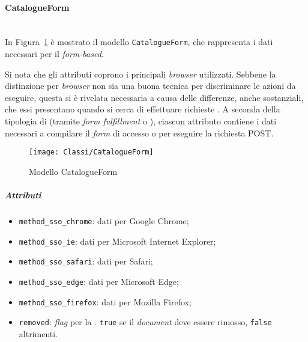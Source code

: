 \paragraph{CatalogueForm} \mbox{} \\
In Figura~\ref{fig:CatalogueForm} è mostrato il modello \texttt{CatalogueForm}, che rappresenta i dati necessari per il  \textit{form-based}. 

Si nota che gli attributi coprono i principali \textit{browser} utilizzati. Sebbene la distinzione per \textit{browser} non sia una buona tecnica per discriminare le azioni da eseguire, questa si è rivelata necessaria a causa delle differenze, anche sostanziali, che essi presentano quando si cerca di effettuare richieste . A seconda della tipologia di  (tramite \textit{form fulfillment} o ), ciascun attributo contiene i dati necessari a compilare il \textit{form} di accesso o per eseguire la richiesta POST.
\begin{figure}[hbpc]
  \begin{center}
    \texttt{[image: Classi/CatalogueForm]}
  \caption[Modello CatalogueForm]{Modello CatalogueForm}
  \label{fig:CatalogueForm}
  \end{center} 
\end{figure}
\subparagraph{Attributi}
\begin{itemize}
\item \texttt{method\_sso\_chrome}: dati per Google Chrome;
\item \texttt{method\_sso\_ie}: dati per Microsoft Internet Explorer;
\item \texttt{method\_sso\_safari}: dati per Safari;
\item \texttt{method\_sso\_edge}: dati per Microsoft Edge;
\item \texttt{method\_sso\_firefox}: dati per Mozilla Firefox;
\item \texttt{removed}: \textit{flag} per la . \texttt{true} se il \textit{document} deve essere rimosso, \texttt{false} altrimenti.
\end{itemize}

